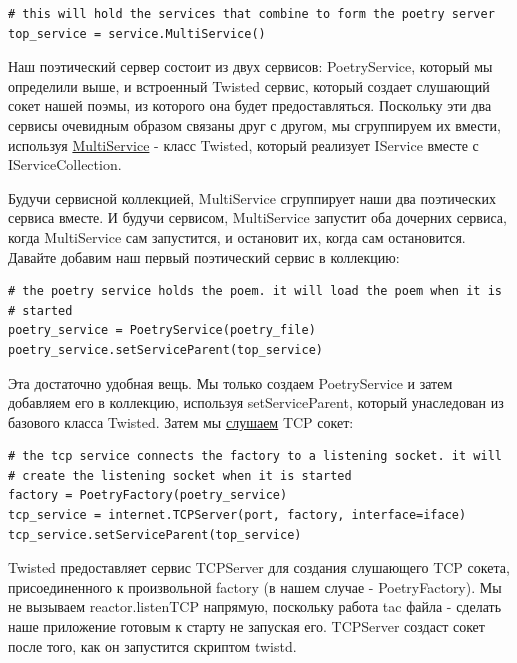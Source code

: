 \begin{scriptsize}\begin{verbatim}
# this will hold the services that combine to form the poetry server
top_service = service.MultiService()
\end{verbatim}\end{scriptsize}


Наш поэтический сервер состоит из двух 
сервисов: PoetryService, который мы определили выше, и 
встроенный Twisted сервис, который создает слушающий сокет 
нашей поэмы, из которого она будет предоставляться. Поскольку 
эти два сервисы очевидным образом связаны друг с другом, 
мы сгруппируем их вмести, используя \href{http://twistedmatrix.com/trac/browser/tags/releases/twisted-10.0.0/twisted/application/service.py#L253}{MultiService} - класс Twisted, 
который реализует IService вместе с IServiceCollection.


Будучи сервисной коллекцией, MultiService сгруппирует 
наши два поэтических сервиса вместе. И будучи сервисом, 
MultiService запустит оба дочерних сервиса, когда 
MultiService сам запустится, и остановит их, когда сам остановится. 
Давайте добавим наш первый поэтический сервис в коллекцию:

\begin{scriptsize}\begin{verbatim}
# the poetry service holds the poem. it will load the poem when it is
# started
poetry_service = PoetryService(poetry_file)
poetry_service.setServiceParent(top_service)
\end{verbatim}\end{scriptsize}


Эта достаточно удобная вещь. Мы только создаем 
PoetryService и затем добавляем его в коллекцию, 
используя setServiceParent, который унаследован из 
базового класса Twisted. Затем мы \href{http://github.com/jdavisp3/twisted-intro/blob/master/twisted-server-3/fastpoetry.py#L53}{слушаем} TCP сокет:

\begin{scriptsize}\begin{verbatim}
# the tcp service connects the factory to a listening socket. it will
# create the listening socket when it is started
factory = PoetryFactory(poetry_service)
tcp_service = internet.TCPServer(port, factory, interface=iface)
tcp_service.setServiceParent(top_service)
\end{verbatim}\end{scriptsize}


Twisted предоставляет сервис TCPServer для создания 
слушающего TCP сокета, присоединенного к 
произвольной factory (в нашем случае - PoetryFactory). 
Мы не вызываем reactor.listenTCP напрямую, поскольку 
работа tac файла - сделать наше приложение готовым к старту 
не запуская его. TCPServer создаст сокет после того, как 
он запустится скриптом twistd.  


